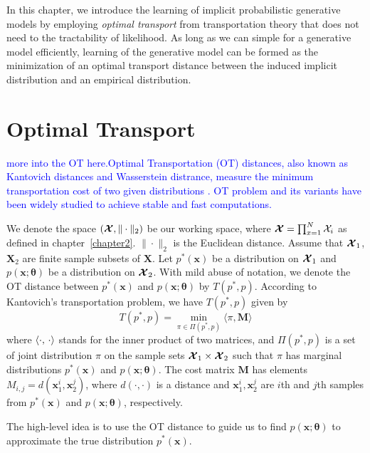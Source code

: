 In this chapter, we introduce the learning of implicit probabilistic generative models by employing \textit{optimal transport} from transportation theory that does not need to the tractability of likelihood. As long as we can simple for a generative model efficiently, learning of the generative model can be formed as the minimization of an optimal transport distance between the induced implicit distribution and an empirical distribution.

\section{Optimal Transport}
\textcolor{blue}{more into the OT here.Optimal Transportation (OT) distances, also known as Kantovich distances
and Wasserstein distrance, measure the minimum transportation cost of
two given distributions \cite{villani2003topics}. OT problem and its
variants have been widely studied to achieve stable and fast computations\cite{2013arXiv1310.4375C}\cite{2013arXiv1306.0895C}\cite{2016arXiv161006519S}\cite{DBLP:conf/icml/ClaiciCS18}.
} 


We denote the space $(\bm{\mathcal{X}},\|\cdot\|_2)$ be our working space, where $\bm{\mathcal{X}} = \prod_{x=1}^{N} \mathcal{X}_i$ as defined in chapter~\ref{chapter2}. $\|\cdot\|_2$ is the Euclidean distance. Assume that $\bm{\mathcal{X}}_1$, $\bm{X}_2$ are finite sample subsets of $\bm{X}$. Let $p^{\ast}(\bm{x})$ be a distribution on $\bm{\mathcal{X}}_1$ and $p(\bm{x};\bm{\theta})$ be a distribution on $\bm{\mathcal{X}}_2$.
With mild abuse of notation, we denote the OT distance between $p^{\ast}(\bm{x})$ and $p(\bm{x}; \bm{\theta})$ by $T(p^{\ast},p)$. According to Kantovich's transportation problem\cite{villani2003topics}, we have $T(p^{\ast},p)$ given by
\begin{equation}\label{chpt8:eq:ot}
  T(p^{\ast}, p) = \min_{\pi\in\Pi(p^{\ast}, p)}\langle\pi,\bm{M}\rangle
\end{equation}
where $\langle \cdot,\,\cdot\rangle$ stands for the inner product of
two matrices, and $\Pi(p^{\ast},p)$ is a set of joint distribution $\pi$ on
the sample sets $\bm{\mathcal{X}}_1\times\bm{\mathcal{X}}_2$ such that $\pi$ has
marginal distributions $p^{\ast}(\bm{x})$ and $p(\bm{x}; \bm{\theta})$. 
The cost matrix $\bm{M}$ has elements $M_{i,j} = d(\bm{x}_1^{i}, \bm{x}_2^{j})$, where $d(\cdot, \cdot)$ is a distance and $\bm{x}_1^{i}, \bm{x}_2^{j}$ are $i$th and $j$th samples from $p^{\ast}(\bm{x})$ and $p(\bm{x}; \bm{\theta})$, respectively. 

The high-level idea is to use the OT distance to guide us to find $p(\bm{x}; \bm{\theta})$ to approximate the true distribution $p^{\ast}(\bm{x})$.


